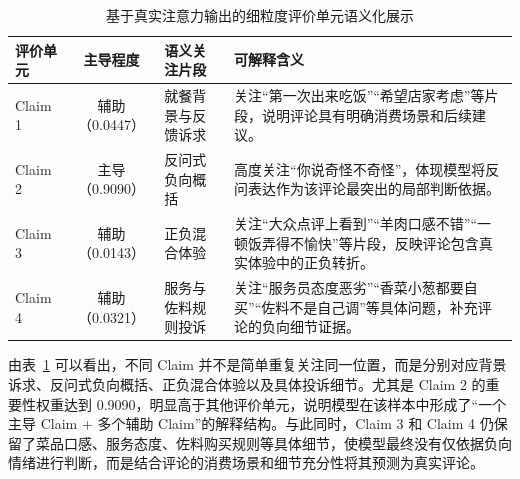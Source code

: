 \documentclass[UTF8,oneside,openright,fontset=none]{ctexbook}
\numberwithin{equation}{chapter}
\begin{document}
\begin{table}[htbp]
  \centering
  \scriptsize
  \caption{四个 Claim 对全部分句的注意力权重}
  \label{tab:claim-attn-full}
\end{table}

\begin{table}[htbp]
  \centering
  \small
  \caption{基于真实注意力输出的细粒度评价单元语义化展示}
  \label{tab:claim-demo-ideal}
  \begin{tabularx}{\textwidth}{lclX}
    \toprule
    评价单元 & 主导程度 & 语义关注片段 & 可解释含义 \\
    \midrule
    Claim 1 & 辅助（0.0447） & 就餐背景与反馈诉求 & 关注“第一次出来吃饭”“希望店家考虑”等片段，说明评论具有明确消费场景和后续建议。 \\
    Claim 2 & 主导（0.9090） & 反问式负向概括 & 高度关注“你说奇怪不奇怪”，体现模型将反问表达作为该评论最突出的局部判断依据。 \\
    Claim 3 & 辅助（0.0143） & 正负混合体验 & 关注“大众点评上看到”“羊肉口感不错”“一顿饭弄得不愉快”等片段，反映评论包含真实体验中的正负转折。 \\
    Claim 4 & 辅助（0.0321） & 服务与佐料规则投诉 & 关注“服务员态度恶劣”“香菜小葱都要自买”“佐料不是自己调”等具体问题，补充评论的负向细节证据。 \\
    \bottomrule
  \end{tabularx}
\end{table}

由表~\ref{tab:claim-demo-ideal} 可以看出，不同 Claim 并不是简单重复关注同一位置，而是分别对应背景诉求、反问式负向概括、正负混合体验以及具体投诉细节。尤其是 Claim 2 的重要性权重达到 0.9090，明显高于其他评价单元，说明模型在该样本中形成了“一个主导 Claim + 多个辅助 Claim”的解释结构。与此同时，Claim 3 和 Claim 4 仍保留了菜品口感、服务态度、佐料购买规则等具体细节，使模型最终没有仅依据负向情绪进行判断，而是结合评论的消费场景和细节充分性将其预测为真实评论。
\end{document}
